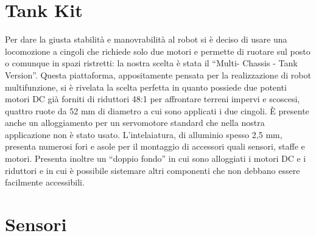 \section {Tank Kit}
Per dare la giusta stabilità e manovrabilità al robot si è deciso di usare una
locomozione a cingoli che richiede solo due motori e permette di ruotare sul 
posto o comunque in spazi ristretti: la nostra scelta è stata il ``Multi-
Chassis - Tank Version''. Questa piattaforma, appositamente pensata per la 
realizzazione di robot multifunzione, si è rivelata la scelta perfetta in 
quanto possiede due potenti motori DC già forniti di riduttori 48:1 per 
affrontare terreni impervi e scoscesi, quattro ruote da 52 mm di diametro a 
cui sono applicati i due cingoli. È presente anche un alloggiamento per un 
servomotore standard che nella nostra applicazione non è stato usato. 
L'intelaiatura, di alluminio spesso 2,5 mm, presenta numerosi fori e asole
per il montaggio di accessori quali sensori, staffe e motori. Presenta
inoltre un ``doppio fondo'' in cui sono alloggiati i motori DC e i riduttori 
e in cui è possibile sistemare altri componenti che non debbano essere 
facilmente accessibili.

\section {Sensori}

